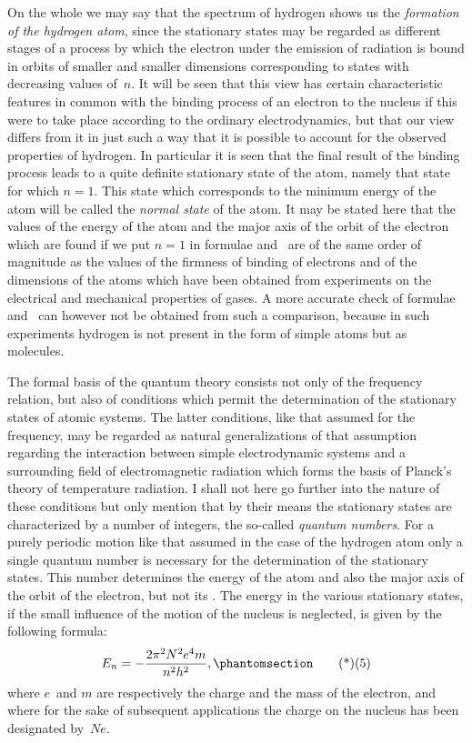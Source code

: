 On the whole we may say that the spectrum of hydrogen shows
us the \emph{formation of the hydrogen atom}, since the stationary states
may be regarded as different stages of a process by which the electron
under the emission of radiation is bound in orbits of smaller
and smaller dimensions corresponding to states with decreasing
values of~$n$. It will be seen that this view has certain characteristic
features in common with the binding process of an electron
to the nucleus if this were to take place according to the ordinary
electrodynamics, but that our view differs from it in just such a
way that it is possible to account for the observed properties of
hydrogen. In particular it is seen that the final result of the
binding process leads to a quite definite stationary state of the
atom, namely that state for which $n = 1$. This state which corresponds
to the minimum energy of the atom will be called the
\emph{normal state} of the atom. It may be stated here that the values of
the energy of the atom and the major axis of the orbit of the
electron which are found if we put $n = 1$ in formulae  and~
are of the same order of magnitude as the values of the firmness
of binding of electrons and of the dimensions of the atoms which
have been obtained from experiments on the electrical and mechanical
properties of gases. A more accurate check of formulae
 and~ can however not be obtained from such a comparison,
because in such experiments hydrogen is not present in the form
of simple atoms but as molecules.

The formal basis of the quantum theory consists not only of the
frequency relation, but also of conditions which permit the determination
of the stationary states of atomic systems. The latter
conditions, like that assumed for the frequency, may be regarded as
natural generalizations of that assumption regarding the interaction
between simple electrodynamic systems and a surrounding field of
electromagnetic radiation which forms the basis of Planck's theory
of temperature radiation. I shall not here go further into the
nature of these conditions but only mention that by their means
the stationary states are characterized by a number of integers,
the so-called \emph{quantum numbers}. For a purely periodic motion like
that assumed in the case of the hydrogen atom only a single
quantum number is necessary for the determination of the stationary
states. This number determines the energy of the atom and also
the major axis of the orbit of the electron, but not its .
The energy in the various stationary states, if the small influence
of the motion of the nucleus is neglected, is given by the following
formula:
\[
E_{n} = -\frac{2\pi^{2} N^{2} e^{4} m}{n^{2} h^{2}},
\Tag{(5)}
\]
where $e$~and $m$ are respectively the charge and the mass of the
electron, and where for the sake of subsequent applications the
charge on the nucleus has been designated by~$Ne$.

